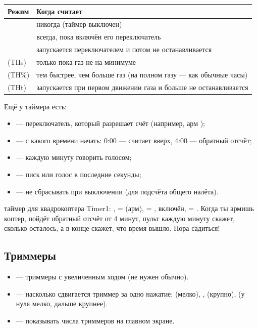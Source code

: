 \begin{center}\small
\renewcommand{\arraystretch}{1.25}
\begin{tabularx}{\linewidth}{@{}L{28mm}Y@{}}
\toprule
\textbf{Режим} & \textbf{Когда считает} \\
\midrule
{} & никогда (таймер выключен) \\
 & всегда, пока включён его переключатель \\
 & запускается переключателем и потом не останавливается \\
 (THs) & только пока газ не на минимуме \\
 (TH\%) & тем быстрее, чем больше газ (на полном газу --- как обычные часы) \\
 (THt) & запускается при первом движении газа и больше не останавливается \\
\bottomrule
\end{tabularx}
\end{center}

Ещё у таймера есть:
\begin{itemize}
  \item {} --- переключатель, который разрешает счёт (например, арм );
  \item {} --- с какого времени начать: 0:00 --- считает вверх, 4:00 --- обратный отсчёт;
  \item {} --- каждую минуту говорить голосом;
  \item {} --- писк или голос в последние секунды;
  \item {} --- не сбрасывать при выключении (для подсчёта общего налёта).
\end{itemize}

\begin{recipe}{таймер для квадрокоптера}
Timer1: ,  =  (арм),  = ,
 включён,  = .
Когда ты армишь коптер, пойдёт обратный отсчёт от 4 минут, пульт каждую минуту скажет, сколько
осталось, а в конце скажет, что время вышло. Пора садиться!
\end{recipe}

\subsection{Триммеры}

\begin{itemize}
  \item {} --- триммеры с увеличенным ходом (не нужен обычно).
  \item {} --- насколько сдвигается триммер за одно нажатие: 
        (мелко), ,  (крупно),  (у нуля мелко,
        дальше крупнее).
  \item {} --- показывать числа триммеров на главном экране.
\end{itemize}

